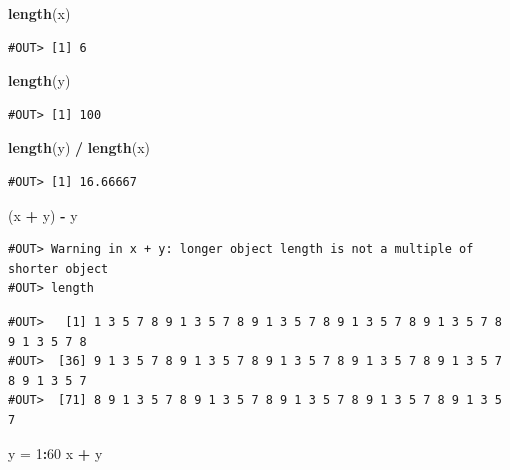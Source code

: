 \documentclass[]{book}
\newenvironment{Shaded}{\begin{snugshade}}{\end{snugshade}}
\newcommand{\KeywordTok}[1]{\textcolor[rgb]{0.13,0.29,0.53}{\textbf{#1}}}
\newcommand{\DecValTok}[1]{\textcolor[rgb]{0.00,0.00,0.81}{#1}}
\newcommand{\StringTok}[1]{\textcolor[rgb]{0.31,0.60,0.02}{#1}}
\newcommand{\OperatorTok}[1]{\textcolor[rgb]{0.81,0.36,0.00}{\textbf{#1}}}
\newcommand{\NormalTok}[1]{#1}
\theoremstyle{definition}
\theoremstyle{definition}
\theoremstyle{definition}
\theoremstyle{remark}
\begin{document}
\begin{Shaded}
\begin{Highlighting}[]
\KeywordTok{length}\NormalTok{(x)}
\end{Highlighting}
\end{Shaded}

\begin{verbatim}
#OUT> [1] 6
\end{verbatim}

\begin{Shaded}
\begin{Highlighting}[]
\KeywordTok{length}\NormalTok{(y)}
\end{Highlighting}
\end{Shaded}

\begin{verbatim}
#OUT> [1] 100
\end{verbatim}

\begin{Shaded}
\begin{Highlighting}[]
\KeywordTok{length}\NormalTok{(y) }\OperatorTok{/}\StringTok{ }\KeywordTok{length}\NormalTok{(x)}
\end{Highlighting}
\end{Shaded}

\begin{verbatim}
#OUT> [1] 16.66667
\end{verbatim}

\begin{Shaded}
\begin{Highlighting}[]
\NormalTok{(x }\OperatorTok{+}\StringTok{ }\NormalTok{y) }\OperatorTok{-}\StringTok{ }\NormalTok{y}
\end{Highlighting}
\end{Shaded}

\begin{verbatim}
#OUT> Warning in x + y: longer object length is not a multiple of shorter object
#OUT> length
\end{verbatim}

\begin{verbatim}
#OUT>   [1] 1 3 5 7 8 9 1 3 5 7 8 9 1 3 5 7 8 9 1 3 5 7 8 9 1 3 5 7 8 9 1 3 5 7 8
#OUT>  [36] 9 1 3 5 7 8 9 1 3 5 7 8 9 1 3 5 7 8 9 1 3 5 7 8 9 1 3 5 7 8 9 1 3 5 7
#OUT>  [71] 8 9 1 3 5 7 8 9 1 3 5 7 8 9 1 3 5 7 8 9 1 3 5 7 8 9 1 3 5 7
\end{verbatim}

\begin{Shaded}
\begin{Highlighting}[]
\NormalTok{y =}\StringTok{ }\DecValTok{1}\OperatorTok{:}\DecValTok{60}
\NormalTok{x }\OperatorTok{+}\StringTok{ }\NormalTok{y}
\end{Highlighting}
\end{Shaded}
\end{document}
